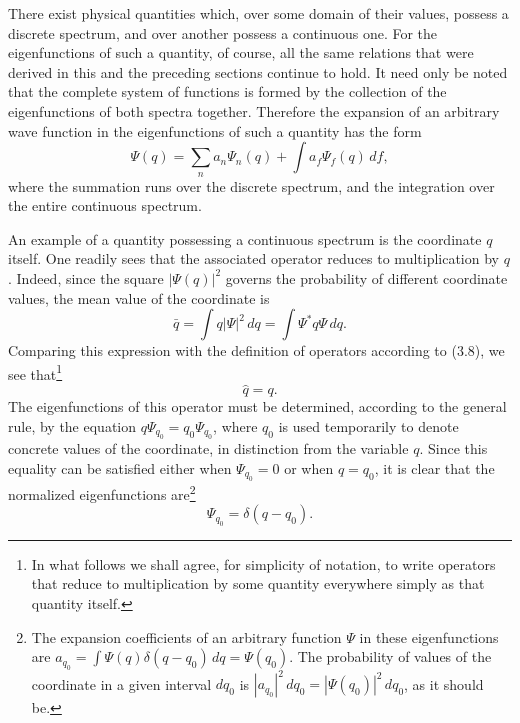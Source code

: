 There exist physical quantities which, over some domain of their values,
possess a discrete spectrum, and over another possess a continuous one. For the
eigenfunctions of such a quantity, of course, all the same relations that were
derived in this and the preceding sections continue to hold. It need only be
noted that the complete system of functions is formed by the collection of the
eigenfunctions of both spectra together. Therefore the expansion of an
arbitrary wave function in the eigenfunctions of such a quantity has the form
\begin{equation}
  \Psi(q)=\sum_n a_n\Psi_n(q)+\int a_f\Psi_f(q)\,df,
  \tag{5.15}
\end{equation}
where the summation runs over the discrete spectrum, and the integration over
the entire continuous spectrum.

An example of a quantity possessing a continuous spectrum is the coordinate
$q$ itself. One readily sees that the associated operator reduces to
multiplication by $q$. Indeed,
since the square $|\Psi(q)|^2$ governs the probability of different coordinate
values, the mean value of the coordinate is
\[
  \bar q=\int q|\Psi|^2\,dq=\int\Psi^*q\Psi\,dq.
\]
Comparing this expression with the definition of operators according to (3.8),
we see that\footnote{In what follows we shall agree, for simplicity of notation,
to write operators that reduce to multiplication by some quantity everywhere
simply as that quantity itself.}
\begin{equation}
  \hat q=q.
  \tag{5.16}
\end{equation}
The eigenfunctions of this operator must be determined, according to the general
rule, by the equation $q\Psi_{q_0}=q_0\Psi_{q_0}$, where $q_0$ is used
temporarily to denote concrete values of the coordinate, in distinction from
the variable $q$. Since this equality can be satisfied either when
$\Psi_{q_0}=0$ or when $q=q_0$, it is clear that the normalized eigenfunctions
are\footnote{The expansion coefficients of an arbitrary function $\Psi$ in these
eigenfunctions are $a_{q_0}=\int\Psi(q)\delta(q-q_0)\,dq=\Psi(q_0)$. The
probability of values of the coordinate in a given interval $dq_0$ is
$|a_{q_0}|^2\,dq_0=|\Psi(q_0)|^2\,dq_0$, as it should be.}
\begin{equation}
  \Psi_{q_0}=\delta(q-q_0).
  \tag{5.17}
\end{equation}
